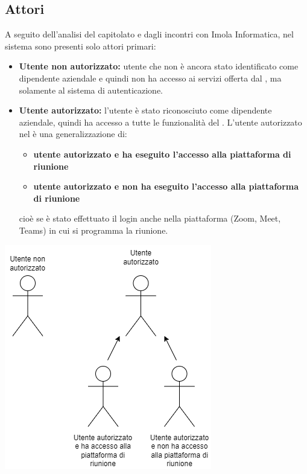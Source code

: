 \subsection{Attori}
A seguito dell'analisi del capitolato e dagli incontri con Imola Informatica, nel sistema sono 
presenti solo attori primari:
\begin{itemize}
    \item \textbf{Utente non autorizzato:} utente che non è ancora stato identificato come dipendente aziendale e quindi non ha accesso ai servizi offerta dal , ma solamente al sistema di autenticazione.
    \item \textbf{Utente autorizzato:} l'utente è stato riconosciuto come dipendente aziendale, quindi 
                ha accesso a tutte le funzionalità del . \newline
                L'utente autorizzato nel  è una generalizzazione di:
                \begin{itemize}
                \item \textbf{utente autorizzato e ha eseguito l'accesso alla piattaforma di riunione}
                \item \textbf{utente autorizzato e non ha eseguito l'accesso alla piattaforma di riunione}
                \end{itemize}
                cioè se è stato effettuato il login anche nella piattaforma (Zoom, Meet, Teams) in 
                cui si programma la riunione.
\end{itemize}

\begin{center}
    \includegraphics[scale=0.70]{images/Attori.png}
\end{center}